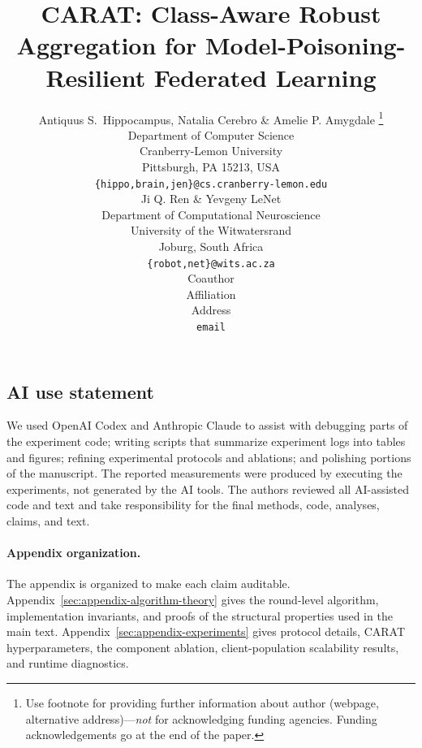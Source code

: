 \documentclass{article} %
\title{CARAT: Class-Aware Robust Aggregation for Model-Poisoning-Resilient Federated Learning}
\author{Antiquus S.~Hippocampus, Natalia Cerebro \& Amelie P. Amygdale \thanks{ Use footnote for providing further information
about author (webpage, alternative address)---\emph{not} for acknowledging
funding agencies.  Funding acknowledgements go at the end of the paper.} \\
Department of Computer Science\\
Cranberry-Lemon University\\
Pittsburgh, PA 15213, USA \\
\texttt{\{hippo,brain,jen\}@cs.cranberry-lemon.edu} \\
\And
Ji Q. Ren \& Yevgeny LeNet \\
Department of Computational Neuroscience \\
University of the Witwatersrand \\
Joburg, South Africa \\
\texttt{\{robot,net\}@wits.ac.za} \\
\AND
Coauthor \\
Affiliation \\
Address \\
\texttt{email}
}
\begin{document}
\maketitle














\subsection*{AI use statement}

We used OpenAI Codex and Anthropic Claude to assist with debugging parts of the experiment code; writing scripts that summarize experiment logs into tables and figures; refining experimental protocols and ablations; and polishing portions of the manuscript. The reported measurements were produced by executing the experiments, not generated by the AI tools. The authors reviewed all AI-assisted code and text and take responsibility for the final methods, code, analyses, claims, and text.

% 



\newpage
\appendix

\paragraph{Appendix organization.}
The appendix is organized to make each claim auditable. Appendix~\ref{sec:appendix-algorithm-theory} gives the round-level algorithm, implementation invariants, and proofs of the structural properties used in the main text. Appendix~\ref{sec:appendix-experiments} gives protocol details, CARAT hyperparameters, the component ablation, client-population scalability results, and runtime diagnostics.








\end{document}
